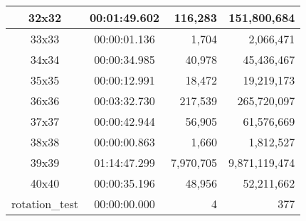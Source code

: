 \begin{center}
\begin{tabular}{|c|c|r|r|}
		32x32 & 00:01:49.602 & 116,283 & 151,800,684 \\ \hline
		33x33 & 00:00:01.136 & 1,704 & 2,066,471 \\ \hline
		34x34 & 00:00:34.985 & 40,978 & 45,436,467 \\ \hline
		35x35 & 00:00:12.991 & 18,472 & 19,219,173 \\ \hline
		36x36 & 00:03:32.730 & 217,539 & 265,720,097 \\ \hline
		37x37 & 00:00:42.944 & 56,905 & 61,576,669 \\ \hline
		38x38 & 00:00:00.863 & 1,660 & 1,812,527 \\ \hline
		39x39 & 01:14:47.299 & 7,970,705 & 9,871,119,474 \\ \hline
		40x40 & 00:00:35.196 & 48,956 & 52,211,662 \\ \hline
		rotation\_test & 00:00:00.000 & 4 & 377 \\ \hline

    \end{tabular}
\end{center}

